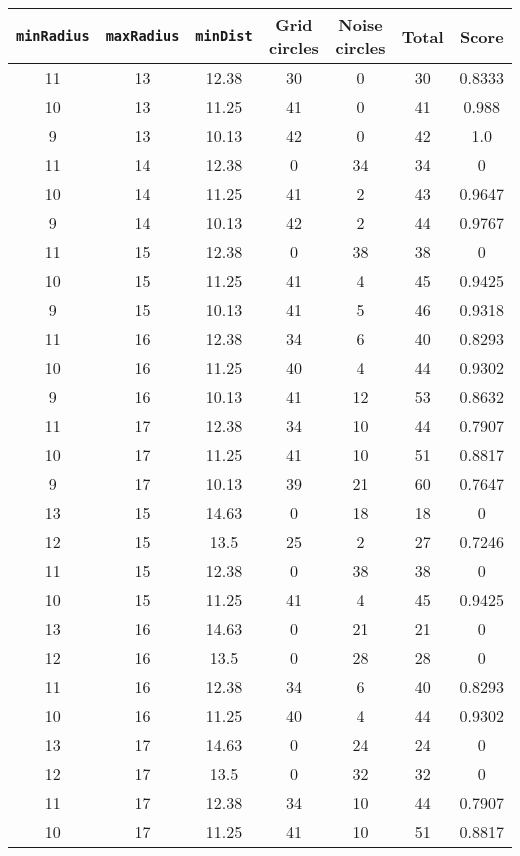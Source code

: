 \documentclass[letterpaper, 12pt]{article}
\begin{document}
\begin{longtable}{|c|c|c|c|c|c|c|}
\hline
\textbf{\texttt{minRadius}} & \textbf{\texttt{maxRadius}} & \textbf{\texttt{minDist}} & \textbf{Grid circles} & \textbf{Noise circles} & \textbf{Total} & \textbf{Score} \\
\hline
11 & 13 & 12.38 & 30 & 0 & 30 & 0.8333 \\
\hline
10 & 13 & 11.25 & 41 & 0 & 41 & 0.988 \\
\hline
9 & 13 & 10.13 & 42 & 0 & 42 & 1.0 \\
\hline
11 & 14 & 12.38 & 0 & 34 & 34 & 0 \\
\hline
10 & 14 & 11.25 & 41 & 2 & 43 & 0.9647 \\
\hline
9 & 14 & 10.13 & 42 & 2 & 44 & 0.9767 \\
\hline
11 & 15 & 12.38 & 0 & 38 & 38 & 0 \\
\hline
10 & 15 & 11.25 & 41 & 4 & 45 & 0.9425 \\
\hline
9 & 15 & 10.13 & 41 & 5 & 46 & 0.9318 \\
\hline
11 & 16 & 12.38 & 34 & 6 & 40 & 0.8293 \\
\hline
10 & 16 & 11.25 & 40 & 4 & 44 & 0.9302 \\
\hline
9 & 16 & 10.13 & 41 & 12 & 53 & 0.8632 \\
\hline
11 & 17 & 12.38 & 34 & 10 & 44 & 0.7907 \\
\hline
10 & 17 & 11.25 & 41 & 10 & 51 & 0.8817 \\
\hline
9 & 17 & 10.13 & 39 & 21 & 60 & 0.7647 \\
\hline
13 & 15 & 14.63 & 0 & 18 & 18 & 0 \\
\hline
12 & 15 & 13.5 & 25 & 2 & 27 & 0.7246 \\
\hline
11 & 15 & 12.38 & 0 & 38 & 38 & 0 \\
\hline
10 & 15 & 11.25 & 41 & 4 & 45 & 0.9425 \\
\hline
13 & 16 & 14.63 & 0 & 21 & 21 & 0 \\
\hline
12 & 16 & 13.5 & 0 & 28 & 28 & 0 \\
\hline
11 & 16 & 12.38 & 34 & 6 & 40 & 0.8293 \\
\hline
10 & 16 & 11.25 & 40 & 4 & 44 & 0.9302 \\
\hline
13 & 17 & 14.63 & 0 & 24 & 24 & 0 \\
\hline
12 & 17 & 13.5 & 0 & 32 & 32 & 0 \\
\hline
11 & 17 & 12.38 & 34 & 10 & 44 & 0.7907 \\
\hline
10 & 17 & 11.25 & 41 & 10 & 51 & 0.8817 \\

\end{longtable}
\end{document}
